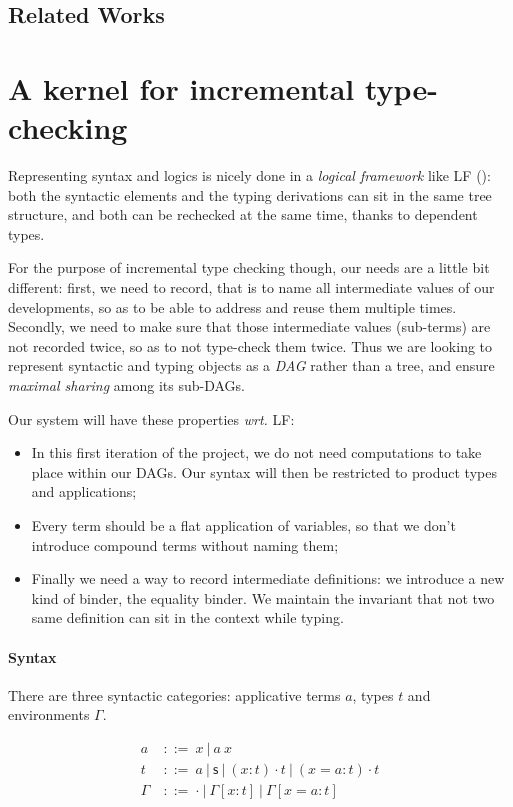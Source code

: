 \documentclass{article}
\newcommand{\sort}{\textsf{s}}
\newcommand{\gor}{\ |\ }
\newcommand{\gdecl}[2]{{#1}\ &::=\ {#2}}
\begin{document}
\subsection{Related Works}

\section{A kernel for incremental type-checking}

Representing syntax and logics is nicely done in a \emph{logical
  framework} like LF (\cite{harper1993framework}): both the syntactic
elements and the typing derivations can sit in the same tree
structure, and both can be rechecked at the same time, thanks to
dependent types.

For the purpose of incremental type checking though, our needs are a
little bit different: first, we need to record, that is to name all
intermediate values of our developments, so as to be able to address
and reuse them multiple times. Secondly, we need to make sure that
those intermediate values (sub-terms) are not recorded twice, so as to
not type-check them twice. Thus we are looking to represent syntactic
and typing objects as a \emph{DAG} rather than a tree, and ensure
\emph{maximal sharing} among its sub-DAGs.

Our system will have these properties \emph{wrt.} LF:
\begin{itemize}
\item In this first iteration of the project, we do not need
  computations to take place within our DAGs. Our syntax will then be
  restricted to product types and applications;
\item Every term should be a flat application of variables, so that we
  don't introduce compound terms without naming them;
\item Finally we need a way to record intermediate definitions: we
  introduce a new kind of binder, the equality binder. We maintain the
  invariant that not two same definition can sit in the context while
  typing.
\end{itemize}

\paragraph{Syntax} There are three syntactic categories: applicative
terms $a$, types $t$ and environments $\Gamma$.

\begin{align*}
 \gdecl{a}{x \gor a\ x } \\
 \gdecl{t}{a \gor \sort \gor (x:t)\cdot t \gor (x=a:t)\cdot t} \\
 \gdecl{\Gamma}{\cdot \gor \Gamma[x:t] \gor \Gamma[x=a:t]}
\end{align*}
\end{document}
